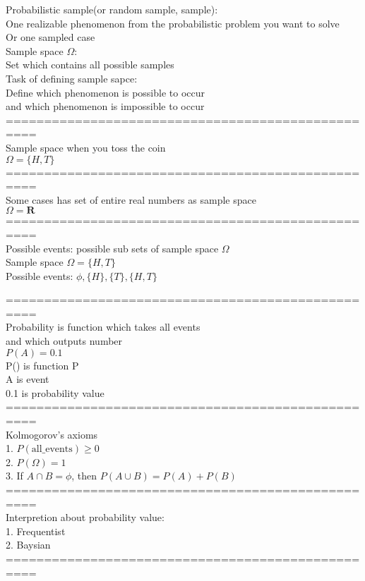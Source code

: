 \documentclass{article}
\begin{document}
Probabilistic sample(or random sample, sample): \\ 
One realizable phenomenon from the probabilistic problem you want to solve \\ 
Or one sampled case \\ 

Sample space $\Omega$: \\ 
Set which contains all possible samples \\ 

Task of defining sample sapce: \\
Define which phenomenon is possible to occur \\
and which phenomenon is impossible to occur \\ 

================================================== \\
Sample space when you toss the coin \\ 
$\Omega =\{H,T\}$ \\ 

================================================== \\
Some cases has set of entire real numbers as sample space \\ 
$\Omega = \mathbf{R}$ \\ 

================================================== \\
Possible events: possible sub sets of sample space $\Omega$ \\ 

Sample space $\Omega=\{H,T\}$ \\ 
Possible events: $\phi,\{H\},\{T\},\{H,T\}$

================================================== \\
Probability is function which takes all events \\
and which outputs number \\ 

$P(A)=0.1$ \\
P() is function P \\
A is event \\
0.1 is probability value \\

================================================== \\
Kolmogorov's axioms \\ 

1. $P(\text{all\_events})\ge 0$ \\ 
2. $P(\Omega)=1$ \\ 
3. If $A\cap B=\phi$, then $P(A\cup B)=P(A)+P(B)$ \\ 

================================================== \\
Interpretion about probability value: \\ 
1. Frequentist \\ 
2. Baysian \\ 

================================================== \\
\end{document}
